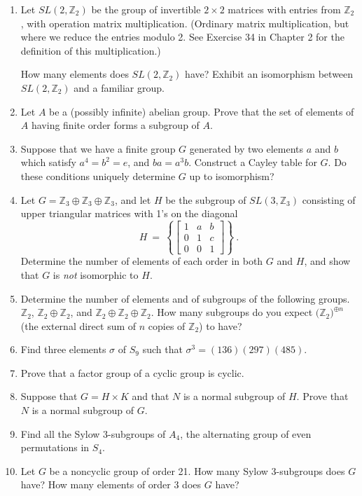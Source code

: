 \documentclass[12pt]{amsart}
\begin{document}
\begin{enumerate}

\item Let $SL(2,\mathbb{Z}_2)$ be the group of invertible $2\times 2$ matrices
      with entries from $\mathbb{Z}_2$, with operation matrix multiplication.
      (Ordinary matrix multiplication, but where we reduce the entries modulo 2.
       See Exercise 34 in Chapter 2 for the definition of this multiplication.)
     
      How many elements does $SL(2,\mathbb{Z}_2)$ have?
      Exhibit an isomorphism between $SL(2,\mathbb{Z}_2)$ and a familiar group.\medskip

\item Let $A$ be a (possibly infinite) abelian group.
      Prove that the set of elements of $A$ having finite order forms a
      subgroup of $A$. \medskip

\item Suppose that we have a finite group $G$ generated by two elements $a$ and 
      $b$ which satisfy  $a^4=b^2=e$, and $ba=a^3b$.
      Construct a Cayley table for $G$.
      Do these conditions uniquely determine $G$ up to isomorphism?\medskip

\item Let $G=\mathbb{Z}_3\oplus\mathbb{Z}_3\oplus\mathbb{Z}_3$, and let $H$ be
      the subgroup of $SL(3,\mathbb{Z}_3)$ consisting of upper triangular
      matrices with 1's on the diagonal
\[
     H\ =\ \left\{ \left[\begin{array}{ccc}1&a&b\\0&1&c\\0&0&1\end{array}
                   \right]\right\}\ .
\]
     Determine the number of elements of each order in both $G$ and $H$,
     and show that $G$ is {\it not} isomorphic to $H$.\medskip

\item Determine the number of elements and of subgroups of the following groups.
      $\mathbb{Z}_2$, $\mathbb{Z}_2\oplus\mathbb{Z}_2$, and
      $\mathbb{Z}_2\oplus\mathbb{Z}_2\oplus\mathbb{Z}_2$.
      How many subgroups do you expect $\bigl(\mathbb{Z}_2\bigr)^{\oplus n}$
      (the external direct sum of $n$ copies of $\mathbb{Z}_2$) to have?\medskip

\item Find three elements $\sigma$ of $S_9$ such that 
      $\sigma^3=(136)(297)(485)$.\medskip

\item Prove that a factor group of a cyclic group is cyclic.\medskip

\item Suppose that $G=H\times K$ and that $N$ is a normal subgroup of $H$.
      Prove that $N$ is a normal subgroup of $G$.\medskip

\item Find all the Sylow 3-subgroups of $A_4$, the alternating group
      of even permutations in $S_4$.\medskip

\item Let $G$ be a noncyclic group of order 21.
      How many Sylow 3-subgroups does $G$ have?
      How many elements of order 3 does $G$ have?
\end{enumerate}
\end{document}
